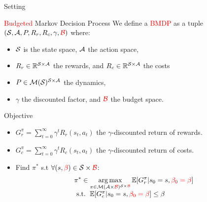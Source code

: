 \documentclass{beamer}
\begin{document}
    \begin{frame}{Setting}
        \begin{block}{\textcolor{red}{Budgeted} Markov Decision Process}
            We define a \textcolor{red}{BMDP} as a tuple $(\mathcal{S}, \mathcal{A}, P, R_r,{R_c}, \gamma,\textcolor{red}{\mathcal{B}})$ where:
            \begin{itemize}
                \item  $\mathcal{S}$ is the state space, $\mathcal{A}$ the action space,
                \item $R_r\in\mathbb{R}^{\mathcal{S} \times \mathcal{A}}$ the rewards, and $R_c\in\mathbb{R}^{\mathcal{S} \times \mathcal{A}}$ the costs
                \item $P\in \mathcal{M}(\mathcal{S})^{\mathcal{S} \times \mathcal{A}}$ the dynamics, %
                \item $\gamma$ the discounted factor, and $\textcolor{red}{\mathcal{B}}$ the budget space.
            \end{itemize}
        \end{block}

        \begin{block}{Objective}
            \begin{itemize}
                \item $G_r^\pi = \sum_{t=0}^\infty \gamma^t R_r(s_t, a_t)$ the $\gamma$-discounted return of rewards.
                \item  $G_c^\pi = \sum_{t=0}^\infty \gamma^t R_c(s_t, a_t)$ the $\gamma$-discounted return of costs.
                \item Find $\pi^*$ s.t $\forall (s,\textcolor{red}{\beta})\in\mathcal{S}\times\textcolor{red}{\mathcal{B}}$:
                \begin{equation}
                    \label{eq:bmdp}
                    \begin{array}{lcr}
                        \displaystyle \pi^* \in \operatorname*{arg\,max}_{\pi\in\mathcal{M}(\mathcal{A}\times\textcolor{red}{\mathcal{B}})^{\mathcal{S}\times\textcolor{red}{\mathcal{B}}}} \operatorname*{\mathbb{E}}[G_r^\pi | s_0=s,\textcolor{red}{\beta_0=\beta}] \\
                        \text{ s.t. }  \operatorname*{\mathbb{E}}[G_c^\pi | s_0=s,\textcolor{red}{\beta_0=\beta}] \leq \beta
                    \end{array}
                \end{equation}
            \end{itemize}
        \end{block}
    \end{frame}
\end{document}
